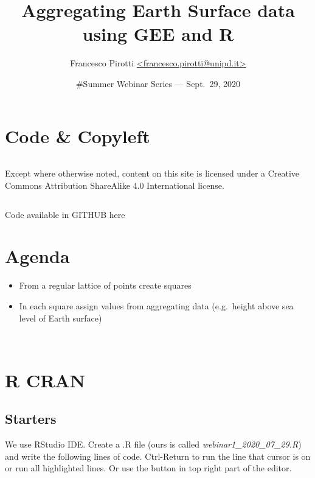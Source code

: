 \documentclass[]{article}
\title{Aggregating Earth Surface data using GEE and R}
\author{Francesco Pirotti
\href{mailto:francesco.pirotti@unipd.it}{\textless{}francesco.pirotti@unipd.it\textgreater{}}}
\date{\#Summer Webinar Series --- Sept.~29, 2020}
\providecommand{\tightlist}{%
  \setlength{\itemsep}{0pt}\setlength{\parskip}{0pt}}
\begin{document}
\maketitle

{
\setcounter{tocdepth}{2}
\tableofcontents
}
\hypertarget{code-copyleft}{%
\section{Code \& Copyleft}\label{code-copyleft}}

\begin{column}{0.48\textwidth}
\begin{column}

Except where otherwise noted, content on this site is licensed under a
Creative Commons Attribution ShareAlike 4.0 International license.

\end{column}
\end{column}

Code available in GITHUB here

\newpage

\hypertarget{agenda}{%
\section{Agenda}\label{agenda}}

\begin{itemize}
\tightlist
\item
  From a regular lattice of points create squares
\item
  In each square assign values from aggregating data (e.g.~height above
  sea level of Earth surface)
\end{itemize}

~

\hypertarget{r-cran}{%
\section{R CRAN}\label{r-cran}}

\hypertarget{starters}{%
\subsection{Starters}\label{starters}}

We use RStudio IDE. Create a .R file (ours is called
\emph{webinar1\_2020\_07\_29.R}) and write the following lines of code.
Ctrl-Return to run the line that cursor is on or run all highlighted
lines. Or use the button in top right part of the editor.
\end{document}
